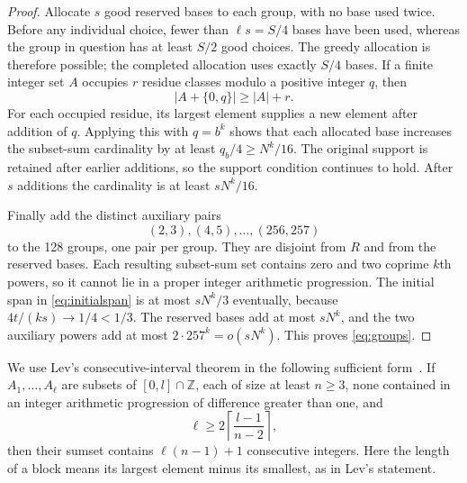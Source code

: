 \documentclass[11pt]{amsart}
\numberwithin{equation}{section}
\theoremstyle{remark}
\newcommand{\Z}{\mathbb Z}
\begin{document}
\begin{proof}
Allocate \(s\) good reserved bases to each group, with no base used
twice. Before any individual choice, fewer than
\(\ell s=S/4\) bases have been used, whereas the group in question
has at least \(S/2\) good choices. The greedy allocation is therefore
possible; the completed allocation uses exactly \(S/4\) bases.
If a finite integer set \(A\) occupies \(r\) residue classes modulo
a positive integer \(q\), then
\[
 |A+\{0,q\}|\ge|A|+r.
\]
For each occupied residue, its largest element supplies a new element
after addition of \(q\).
Applying this with \(q=b^k\) shows that each allocated base increases
the subset-sum cardinality by at least \(q_b/4\ge N^k/16\).
The original support is retained after earlier additions, so the
support condition continues to hold. After \(s\) additions the
cardinality is at least \(sN^k/16\).

Finally add the distinct auxiliary pairs
\[
 (2,3),(4,5),\ldots,(256,257)
\]
to the 128 groups, one pair per group.
They are disjoint from \(R\) and from the reserved bases.
Each resulting subset-sum set contains zero and two coprime \(k\)th
powers, so it cannot lie in a proper integer arithmetic progression.
The initial span in \eqref{eq:initialspan} is at most \(sN^k/3\)
eventually, because \(4t/(ks)\to1/4<1/3\).
The reserved bases add at most \(sN^k\), and the two auxiliary powers
add at most \(2\cdot257^k=o(sN^k)\).
This proves \eqref{eq:groups}.
\end{proof}

We use Lev's consecutive-interval theorem in the following sufficient
form~\cite[Corollary~1]{Lev}. If \(A_1,\ldots,A_\ell\) are subsets of
\([0,l]\cap\Z\), each of size at least \(n\ge3\), none contained in an
integer arithmetic progression of difference greater than one, and
\[
 \ell\ge2\left\lceil\frac{l-1}{n-2}\right\rceil,
\]
then their sumset contains \(\ell(n-1)+1\) consecutive integers.
Here the length of a block means its largest element minus its smallest,
as in Lev's statement.
\end{document}
